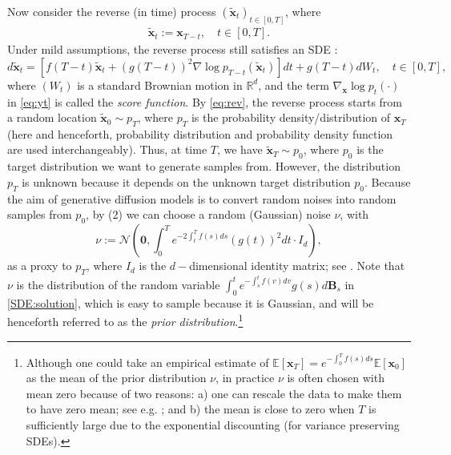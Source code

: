 \documentclass[11pt]{article}
\begin{document}
\begin{itemize}
Now consider the reverse (in time) process $(\tilde{\mathbf{x}}_{t})_{t\in[0,T]}$, where
\begin{align}\label{eq:rev}
\tilde{\mathbf{x}}_{t} := \mathbf{x}_{T-t}, \quad  t\in[0,T].
\end{align}
Under mild assumptions, the reverse process still satisfies an SDE \citep{Anderson1982, haussmann1986time, cattiaux2023time}:  %
\begin{equation}\label{eq:yt}
d\tilde{\mathbf{x}}_{t}=[f(T-t)\tilde{\mathbf{x}}_{t}+(g(T-t))^{2}\nabla\log p_{T-t}(\tilde{\mathbf{x}}_{t})]dt
+g(T-t)dW_t,  \quad  t\in[0,T], %
\end{equation}
where $(W_t)$ is a standard Brownian motion in $\mathbb{R}^d$, and the term $\nabla_{\mathbf{x}}\log p_{t}(\cdot)$ in \eqref{eq:yt} is called the {\it score function}. By \eqref{eq:rev}, the reverse process starts from a random location $\tilde{\mathbf{x}}_{0}\sim p_{T}$, where $p_T$ is the probability density/distribution of $\mathbf{x}_T$ (here and henceforth, probability distribution and probability density function are used interchangeably). Thus, at time $T$, we have
$\tilde{\mathbf{x}}_{T}\sim p_{0}$, where $p_0$ is the target distribution we want to generate samples from.
However, the distribution $p_{T}$ is unknown because it depends on the unknown target distribution $p_{0}$. Because
the aim of generative diffusion models is to convert random noises into random samples from $p_0$, by (2) we can choose a random (Gaussian) noise $\nu$, with
\begin{equation} \label{eq:hatp}
\nu:=\mathcal{N}\left(\mathbf{0},\int_{0}^{T}e^{-2\int_{t}^{T}f(s)ds}(g(t))^{2}dt\cdot I_{d}\right),
\end{equation}
as a proxy to $p_T$, where $I_d$ is the $d-$dimensional identity matrix; see \cite{SongICLR2021, leeconvergence}.
Note that $\nu$ is the distribution of the random variable $\int_{0}^{t}e^{-\int_{s}^{t}f(v)dv}g(s)d\mathbf{B}_{s}$ in
\eqref{SDE:solution}, which is easy to sample because it is Gaussian, and will be henceforth referred to as the {\it prior distribution}.\footnote{Although one could take an empirical estimate of $\mathbb{E}[\mathbf{x}_T] = e^{-\int_{0}^{T}f(s)ds} \mathbb{E}[\mathbf{x}_{0}]$ as the mean of the prior distribution $\nu$, in practice $\nu$ is often chosen with mean zero because of two reasons: a) one can rescale the data to make them to have zero mean; see e.g. \cite{Ho2020}; and b) the mean is close to zero when $T$ is sufficiently large due to the exponential discounting (for variance preserving SDEs).}



\end{itemize}
\end{document}
